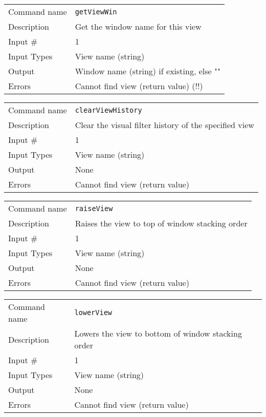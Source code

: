 \bigskip

\noindent
\begin{tabular}{l|p{5in}}
\hline
Command name & {\tt getViewWin} \\
Description  & Get the window name for this view \\
Input \#     & 1 \\
Input Types  & View name (string) \\
Output       & Window name (string) if existing, else "" \\
Errors       & Cannot find view (return value) (!!) \\
\hline
\end{tabular}

\bigskip

\noindent
\begin{tabular}{l|p{5in}}
\hline
Command name & {\tt clearViewHistory} \\
Description  & Clear the visual filter history of the specified view \\
Input \#     & 1 \\
Input Types  & View name (string) \\
Output       & None \\
Errors       & Cannot find view (return value) \\
\hline
\end{tabular}

\bigskip

\noindent
\begin{tabular}{l|p{5in}}
\hline
Command name & {\tt raiseView} \\
Description  & Raises the view to top of window stacking order \\
Input \#     & 1 \\
Input Types  & View name (string) \\
Output       & None \\
Errors       & Cannot find view (return value) \\
\hline
\end{tabular}

\bigskip

\noindent
\begin{tabular}{l|p{5in}}
\hline
Command name & {\tt lowerView} \\
Description  & Lowers the view to bottom of window stacking order \\
Input \#     & 1 \\
Input Types  & View name (string) \\
Output       & None \\
Errors       & Cannot find view (return value) \\
\hline
\end{tabular}

